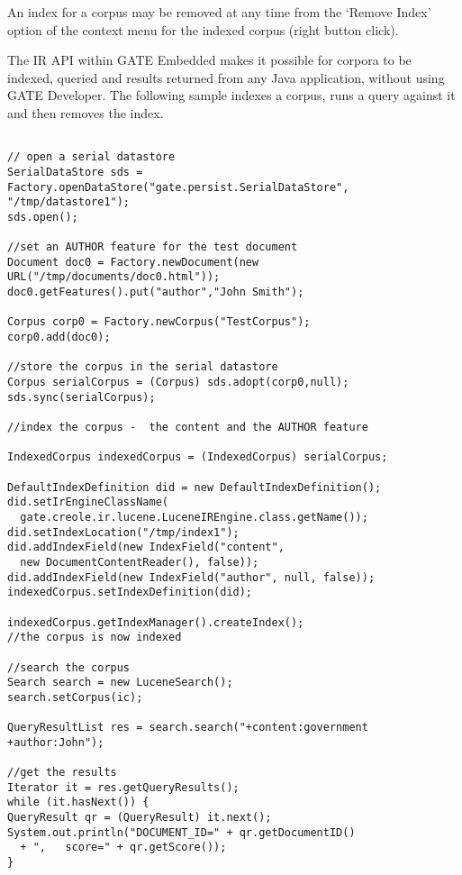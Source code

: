 
An index for a corpus may be removed at any time from the `Remove
Index' option of the context menu for the indexed corpus (right button
click).



The IR API within GATE Embedded makes it possible for corpora to be
indexed, queried and results returned from any Java application,
without using GATE Developer. The following sample indexes a corpus,
runs a query against it and then removes the index.

\begin{lstlisting}

// open a serial datastore
SerialDataStore sds =
Factory.openDataStore("gate.persist.SerialDataStore",
"/tmp/datastore1");
sds.open();

//set an AUTHOR feature for the test document
Document doc0 = Factory.newDocument(new URL("/tmp/documents/doc0.html"));
doc0.getFeatures().put("author","John Smith");

Corpus corp0 = Factory.newCorpus("TestCorpus");
corp0.add(doc0);

//store the corpus in the serial datastore
Corpus serialCorpus = (Corpus) sds.adopt(corp0,null);
sds.sync(serialCorpus);

//index the corpus -  the content and the AUTHOR feature

IndexedCorpus indexedCorpus = (IndexedCorpus) serialCorpus;

DefaultIndexDefinition did = new DefaultIndexDefinition();
did.setIrEngineClassName(
  gate.creole.ir.lucene.LuceneIREngine.class.getName());
did.setIndexLocation("/tmp/index1");
did.addIndexField(new IndexField("content",
  new DocumentContentReader(), false));
did.addIndexField(new IndexField("author", null, false));
indexedCorpus.setIndexDefinition(did);

indexedCorpus.getIndexManager().createIndex();
//the corpus is now indexed

//search the corpus
Search search = new LuceneSearch();
search.setCorpus(ic);

QueryResultList res = search.search("+content:government +author:John");

//get the results
Iterator it = res.getQueryResults();
while (it.hasNext()) {
QueryResult qr = (QueryResult) it.next();
System.out.println("DOCUMENT_ID=" + qr.getDocumentID()
  + ",   score=" + qr.getScore());
}

\end{lstlisting}


